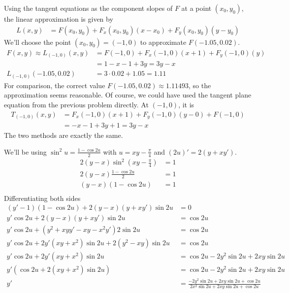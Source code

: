 \documentclass[a4paper,norsk,12pt]{article}
\begin{document}
Using the tangent equations as the component slopes of $F$ at a point $(x_0,
y_0)$, the linear approximation is given by
\begin{align*}
  L(x,y) &= F(x_0, y_0) + F_x(x_0, y_0)(x-x_0) + F_y(x_0, y_0)(y-y_0)
\end{align*}
We'll choose the point $(x_0, y_0) = (-1, 0)$ to approximate $F(-1.05, 0.02)$.
\begin{align*}
  F(x,y) \approx
  L_{(-1,0)}(x,y)
    &= F(-1,0) + F_x(-1,0)(x+1) + F_y(-1,0)(y) \\
    &= 1 - x - 1 + 3y = 3y-x \\
  L_{(-1,0)}(-1.05, 0.02)
    &= 3\cdot0.02 + 1.05 = 1.11
\end{align*}
For comparison, the correct value $F(-1.05, 0.02) \approx 1.11493$, so the
approximation seems reasonable. Of course, we could have used the tangent plane
equation from the previous problem directly. At $(-1,0)$, it is
\begin{align*}
  T_{(-1,0)}(x,y)
    &= F_x(-1,0)(x+1) + F_y(-1,0)(y-0) + F(-1,0)\\
    &= -x-1 + 3y + 1 = 3y-x
\end{align*}
The two methods are exactly the same.

We'll be using $\sin^2{u} = \frac{1-\cos{2u}}{2}$ with $u=xy-\frac{\pi}{4}$ and
$(2u)' = 2(y+xy')$.
\begin{align*}
  2(y-x)\sin^2{(xy-\frac{\pi}{4})} &= 1 \\
  2(y-x)\frac{1-\cos{2u}}{2} &= 1 \\
  (y-x)(1-\cos{2u}) &= 1 \\
\end{align*}
Differentiating both sides
\begin{align*}
  (y'-1)(1-\cos{2u}) + 2(y-x)(y+xy')\sin{2u} &= 0 \\
  y'\cos{2u} + 2(y-x)(y+xy')\sin{2u} &= \cos{2u} \\
  y'\cos{2u} + (y^2+xyy'-xy-x^2y')2\sin{2u} &= \cos{2u} \\
  y'\cos{2u} + 2y'(xy+x^2)\sin{2u}+2(y^2-xy)\sin{2u} &= \cos{2u} \\
  y'\cos{2u} + 2y'(xy+x^2)\sin{2u} &= \cos{2u}-2y^2\sin{2u}+2xy\sin{2u} \\
  y'(\cos{2u} + 2(xy+x^2)\sin{2u}) &= \cos{2u}-2y^2\sin{2u}+2xy\sin{2u} \\
  y' &= \frac{ -2y^2\sin{2u} + 2xy\sin{2u} + \cos{2u} }
             {  2x^2\sin{2u} + 2xy\sin{2u} + \cos{2u} } \\
\end{align*}
\end{document}
